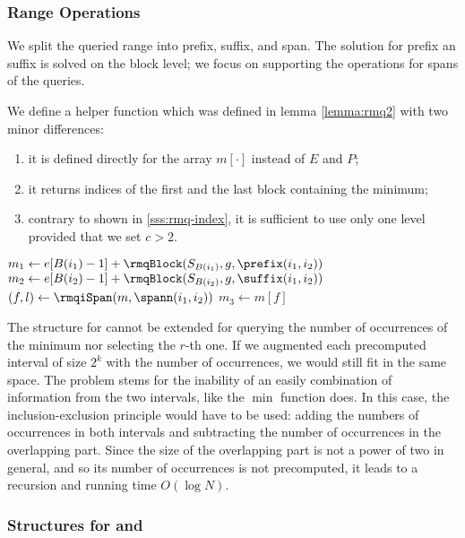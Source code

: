 \subsubsection{Range Operations}

We split the queried range into prefix, suffix, and span.
The solution for prefix an suffix is solved on the block level; we focus on supporting the operations for spans of the queries.

We define a helper function \rmqiSpan{} which was defined in lemma \ref{lemma:rmq2} with two minor differences:
\begin{enumerate}
	\item it is defined directly for the array $m[\cdot]$ instead of $E$ and $P$;
	\item it returns indices of the first and the last block containing the minimum;
	\item contrary to \rmqi{} shown in \ref{sss:rmq-index}, it is sufficient to use only one level provided that we set $c > 2$.
\end{enumerate}

\begin{algorithmic}
	\State $m_1 \gets e[B(i_1) - 1] + \rmqBlock(S_{B(i_1)}, g, \prefix(i_1, i_2))$
	\State $m_2 \gets e[B(i_2) - 1] + \rmqBlock(S_{B(i_2)}, g, \suffix(i_1, i_2))$
	\State $(f, l) \gets \rmqiSpan(m, \spann(i_1, i_2))$
	\State $m_3 \gets m[f]$
	\State {}
\EndFunction
\end{algorithmic}

The structure for \rmqiSpan{} cannot be extended for querying the number of occurrences of the minimum nor selecting the $r$-th one.
If we augmented each precomputed interval of size $2^k$ with the number of occurrences, we would still fit in the same space.
The problem stems for the inability of an easily combination of information from the two intervals, like the $\min$ function does.
In this case, the inclusion-exclusion principle would have to be used: adding the numbers of occurrences in both intervals and subtracting the number of occurrences in the overlapping part.
Since the size of the overlapping part is not a power of two in general, and so its number of occurrences is not precomputed, it leads to a recursion and running time $O(\log N)$.

\subsubsection{Structures for \rmqSize{} and \rmqSelect{}}

